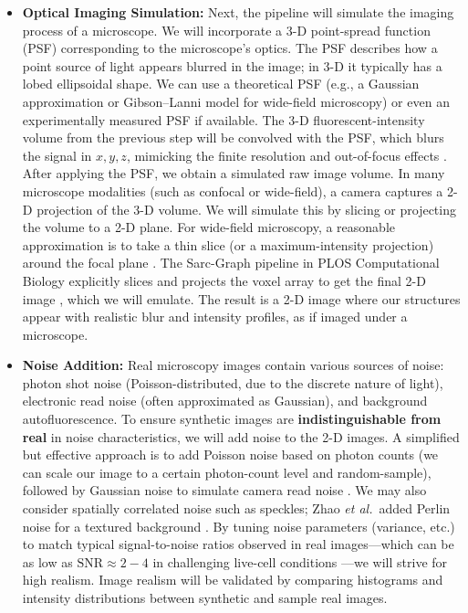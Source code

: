 \documentclass[
oneside,      %
openany       %
]{imc-inf}
\begin{document}
\begin{itemize}
		\item \textbf{Optical Imaging Simulation:} Next, the pipeline will simulate the imaging process of a microscope. We will incorporate a 3-D point-spread function (PSF) corresponding to the microscope’s optics. The PSF describes how a point source of light appears blurred in the image; in 3-D it typically has a lobed ellipsoidal shape. We can use a theoretical PSF (e.g., a Gaussian approximation or Gibson–Lanni model for wide-field microscopy) or even an experimentally measured PSF if available. The 3-D fluorescent-intensity volume from the previous step will be convolved with the PSF, which blurs the signal in \(x,y,z\), mimicking the finite resolution and out-of-focus effects \cite{sekh2021}. After applying the PSF, we obtain a simulated raw image volume. In many microscope modalities (such as confocal or wide-field), a camera captures a 2-D projection of the 3-D volume. We will simulate this by slicing or projecting the volume to a 2-D plane. For wide-field microscopy, a reasonable approximation is to take a thin slice (or a maximum-intensity projection) around the focal plane \cite{zhao2021}. The Sarc-Graph pipeline in PLOS Computational Biology explicitly slices and projects the voxel array to get the final 2-D image \cite{zhao2021}, which we will emulate. The result is a 2-D image where our structures appear with realistic blur and intensity profiles, as if imaged under a microscope.
		
		\item \textbf{Noise Addition:} Real microscopy images contain various sources of noise: photon shot noise (Poisson-distributed, due to the discrete nature of light), electronic read noise (often approximated as Gaussian), and background autofluorescence. To ensure synthetic images are \textbf{indistinguishable from real} in noise characteristics, we will add noise to the 2-D images. A simplified but effective approach is to add Poisson noise based on photon counts (we can scale our image to a certain photon-count level and random-sample), followed by Gaussian noise to simulate camera read noise \cite{zhao2021}. We may also consider spatially correlated noise such as speckles; Zhao \textit{et al.}\ added Perlin noise for a textured background \cite{zhao2021}. By tuning noise parameters (variance, etc.) to match typical signal-to-noise ratios observed in real images—which can be as low as $\mathrm{SNR}\approx2\!-\!4$ in challenging live-cell conditions \cite{sekh2021}—we will strive for high realism. Image realism will be validated by comparing histograms and intensity distributions between synthetic and sample real images.
		
	\end{itemize}
	
\end{document}
